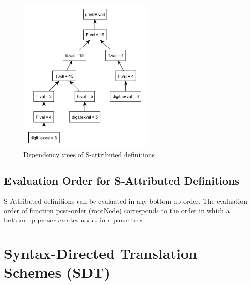 \begin{figure}[H]
	\centerline{\includegraphics[width=0.6\textwidth]{img/14.pdf}}
	\caption{Dependency trees of S-attributed definitions}
\end{figure}

\subsection{Evaluation Order for S-Attributed Definitions}
S-Attributed definitions can be evaluated in any bottom-up order.
The evaluation order of function post-order (rootNode) corresponds to the order in which a bottom-up parser creates nodes in a parse tree.

\section{Syntax-Directed Translation Schemes (SDT)}
